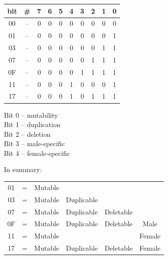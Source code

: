 \documentclass[11pt,twoside,a4paper]{article}
\begin{document}
\begin{minipage}[ht]{0.325\textwidth}
	\begin{tabular}[c]{ c c c c c c c c c c }
		bit & \# & 7 & 6 & 5 & 4 & 3 & 2 & 1 & 0 \\
		\hline
		00 & -- & 0 & 0 & 0 & 0 & 0 & 0 & 0 & 0 \\
		01 & -- & 0 & 0 & 0 & 0 & 0 & 0 & 0 & 1 \\
		03 & -- & 0 & 0 & 0 & 0 & 0 & 0 & 1 & 1 \\
		07 & -- & 0 & 0 & 0 & 0 & 0 & 1 & 1 & 1 \\
		0F & -- & 0 & 0 & 0 & 0 & 1 & 1 & 1 & 1 \\
		11 & -- & 0 & 0 & 0 & 1 & 0 & 0 & 0 & 1 \\
		17 & -- & 0 & 0 & 0 & 1 & 0 & 1 & 1 & 1 \\
	\end{tabular}
\end{minipage} \hfill \begin{minipage}[ht]{0.175\textwidth}
	\footnotesize
	Bit 0 -- mutability ~\\
	Bit 1 -- duplication ~\\
	Bit 2 -- deletion ~\\
	Bit 3 -- male-specific ~\\ %
	Bit 4 -- female-specific ~\\ %
\end{minipage} \hfill \begin{minipage}[ht]{0.45\textwidth}
	\small
	In summary: ~\\
	\begin{tabular}[c]{ c c c c c c }
		01	&	=	&	Mutable	&				&				&			\\
		03	&	=	&	Mutable	&	Duplicable	&				&			\\
		07	&	=	&	Mutable	&	Duplicable	&	Deletable	&			\\
		0F	&	=	&	Mutable	&	Duplicable	&	Deletable	&	Male	\\
		11	&	=	&	Mutable	&				&				&	Female	\\
		17	&	=	&	Mutable	&	Duplicable	&	Deletable	&	Female	\\
	\end{tabular}
\end{minipage} ~\\
\end{document}
